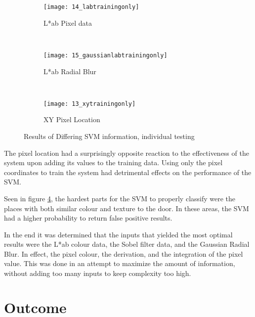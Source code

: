 \begin{figure}
        \centering
        \begin{subfigure}[b]{0.3\textwidth}
                \centering
                \texttt{[image: 14\_labtrainingonly]}
                \caption{L*ab Pixel data}
                \label{fig:14_labtrainingonly}
        \end{subfigure}%
        ~ %
        \begin{subfigure}[b]{0.3\textwidth}
                \centering
                \texttt{[image: 15\_gaussianlabtrainingonly]}
                \caption{L*ab Radial Blur}
                \label{fig:15_gaussianlabtrainingonly}
        \end{subfigure}
        ~ %
        \begin{subfigure}[b]{0.3\textwidth}
                \centering
                \texttt{[image: 13\_xytrainingonly]}
                \caption{XY Pixel Location}
                \label{fig:13_xytrainingonly}
        \end{subfigure}
        \caption{Results of Differing SVM information, individual testing}\label{fig:labResults}
\end{figure}
The pixel location had a surprisingly opposite reaction to the effectiveness of the system upon adding its values to the training data. Using only the pixel coordinates to train the system had detrimental effects on the performance of the SVM. 

Seen in figure \ref{fig:labResults}, the hardest parts for the SVM to properly classify were the places with both similar colour and texture to the door. In these areas, the SVM had a higher probability to return false positive results.

In the end it was determined that the inputs that yielded the most optimal results were the L*ab colour data, the Sobel filter data, and the Gaussian Radial Blur. In effect, the pixel colour, the derivation, and the integration of the pixel value. This was done in an attempt to maximize the amount of information, without adding too many inputs to keep complexity too high.

\newpage

\section{Outcome}

